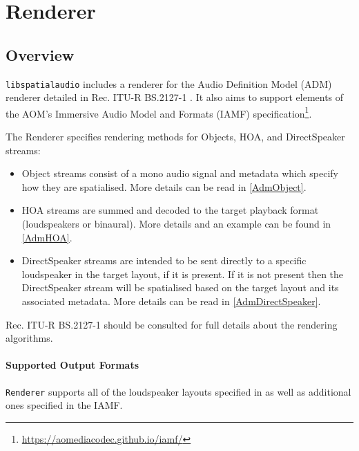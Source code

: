\documentclass[12pt]{report}
\def\libspataud{\texttt{libspatialaudio}\xspace}
\newcommand{\code}[1]{\texttt{#1}}
\begin{document}
\chapter{Renderer}\label{Renderer}

\section{Overview}

\libspataud includes a renderer for the Audio Definition Model (ADM) renderer detailed in Rec. ITU-R BS.2127-1 \cite{ITU2127}. It also aims to support elements of the AOM's Immersive Audio Model and Formats (IAMF) specification\footnote{\href{https://aomediacodec.github.io/iamf/}{https://aomediacodec.github.io/iamf/}}.

The Renderer specifies rendering methods for Objects, HOA, and DirectSpeaker streams:
\begin{itemize}
    \item Object streams consist of a mono audio signal and metadata which specify how they are spatialised. More details can be read in \cref{AdmObject}.
    \item HOA streams are summed and decoded to the target playback format (loudspeakers or binaural). More details and an example can be found in \cref{AdmHOA}.
    \item DirectSpeaker streams are intended to be sent directly to a specific loudspeaker in the target layout, if it is present.
If it is not present then the DirectSpeaker stream will be spatialised based on the target layout and its associated metadata. More details can be read in \cref{AdmDirectSpeaker}.
\end{itemize}

Rec. ITU-R BS.2127-1 \cite{ITU2127} should be consulted for full details about the rendering algorithms.

\subsubsection{Supported Output Formats}

\code{Renderer} supports all of the loudspeaker layouts specified in \cite{ITU2127} as well as additional ones specified in the IAMF.
\end{document}
